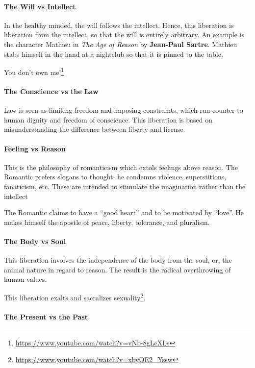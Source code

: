 \paragraph{The Will vs Intellect}


In the healthy minded, the will follows the intellect. Hence, this liberation is liberation from the intellect, so that the will is entirely arbitrary. An example is the character Mathieu in \emph{The Age of Reason} by \textbf{Jean-Paul Sartre}. Mathieu stabs himself in the hand at a nightclub so that it is pinned to the table.

You don't own me!\footnote{\url{https://www.youtube.com/watch?v=vNb-8gLcXLs}}

\paragraph{The Conscience vs the Law}


Law is seen as limiting freedom and imposing constraints, which run counter to human dignity and freedom of conscience. This liberation is based on misunderstanding the difference between liberty and license.

\paragraph{Feeling vs Reason}


This is the philosophy of romanticism which extols feelings above reason. The Romantic prefers slogans to thought: he condemns violence, superstitions, fanaticism, etc. These are intended to stimulate the imagination rather than the intellect

The Romantic claims to have a ``good heart'' and to be motivated by ``love''. He makes himself the apostle of peace, liberty, tolerance, and pluralism.

\paragraph{The Body vs Soul}


This liberation involves the independence of the body from the soul, or, the animal nature in regard to reason. The result is the radical overthrowing of human values.

This liberation exalts and sacralizes sexuality\footnote{\url{https://www.youtube.com/watch?v=xbyOE2\_Yssw}}.

\paragraph{The Present vs the Past}



